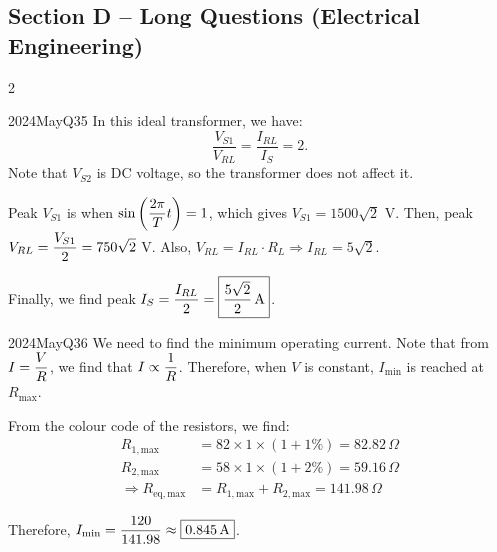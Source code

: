 \subsection*{Section D -- Long Questions (Electrical Engineering)}
\begin{multicols}{2}

\begin{qsolution}{2024}{May}{Q35}{\tgEE \tgEETransformer \tgEECircuitAnalysis}
    In this ideal transformer, we have:
    \[\frac{V_{S1}}{V_{RL}}=\frac{I_{RL}}{I_S}=2.\]
    Note that $V_{S2}$ is DC voltage, so the transformer does not affect it.
    
    Peak $V_{S1}$ is when $\displaystyle\sin\left(\frac{2\pi}{T}t\right)=1$, which gives $V_{S1}=1500\sqrt 2$ V.
    Then, peak $\displaystyle V_{RL}=\frac{V_{S1}}{2}=750\sqrt 2$ V.
    Also, $V_{RL}=I_{RL}\cdot R_{L} \Rightarrow I_{RL}=5\sqrt 2$.

    Finally, we find peak $\displaystyle I_S=\frac{I_{RL}}{2}=\boxed{\frac{5\sqrt 2}{2}\,\mathrm{A}}$.
\end{qsolution}

\columnbreak

\begin{qsolution}{2024}{May}{Q36}{\tgEE \tgEEResistors \tgEECircuitAnalysis}
    We need to find the minimum operating current.
    Note that from $\displaystyle I=\frac{V}{R}$, we find that $\displaystyle I\propto \frac{1}{R}$.
    Therefore, when $V$ is constant, $I_{\mathrm{min}}$ is reached at $R_{\mathrm{max}}$.

    From the colour code of the resistors, we find:
    \begin{align*}
        R_{1,\mathrm{max}} &= 82\times 1 \times(1+1\%)=82.82\,\Omega \\
        R_{2,\mathrm{max}} &= 58\times 1 \times(1+2\%)=59.16\,\Omega \\
        \Rightarrow R_{\mathrm{eq, max}}&=R_{1,\mathrm{max}}+R_{2,\mathrm{max}}=141.98\,\Omega
    \end{align*}

    Therefore, $\displaystyle I_{\mathrm{min}}=\frac{120}{141.98}\approx \boxed{0.845\,\mathrm{A}}$.
\end{qsolution}

\end{multicols}